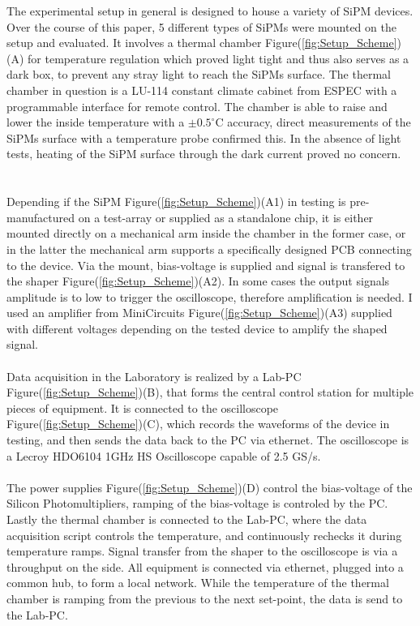 \documentclass[12pt,article,type=msc,colorback,accentcolor=tud9c]{tudthesis}
\begin{document}
The experimental setup in general is designed to house a variety of SiPM devices. Over the course of this paper, 5 different types of SiPMs were mounted on the setup and evaluated. It involves a thermal chamber Figure(\ref{fig:Setup_Scheme})(A) for temperature regulation which proved light tight and thus also serves as a dark box, to prevent any stray light to reach the SiPMs surface. The thermal chamber in question is a LU-114 constant climate cabinet from ESPEC with a programmable interface for remote control. The chamber is able to raise and lower the inside temperature with a $\pm0.5^\circ$C accuracy, direct measurements of the SiPMs surface with a temperature probe confirmed this. In the absence of light tests, heating of the SiPM surface through the dark current proved no concern.\\\\\\ Depending if the SiPM Figure(\ref{fig:Setup_Scheme})(A1) in testing is pre-manufactured on a test-array or supplied as a standalone chip, it is either mounted directly on a mechanical arm inside the chamber in the former case, or in the latter the mechanical arm supports a specifically designed PCB connecting to the device. Via the mount, bias-voltage is supplied and signal is transfered to the shaper Figure(\ref{fig:Setup_Scheme})(A2). In some cases the output signals amplitude is to low to trigger the oscilloscope, therefore amplification is needed. I used an amplifier from MiniCircuits Figure(\ref{fig:Setup_Scheme})(A3) supplied with different voltages depending on the tested device to amplify the shaped signal.\\\\
Data acquisition in the Laboratory is realized by a Lab-PC Figure(\ref{fig:Setup_Scheme})(B), that forms the central control station for multiple pieces of equipment. It is connected to the oscilloscope Figure(\ref{fig:Setup_Scheme})(C), which records the waveforms of the device in testing, and then sends the data back to the PC via ethernet. The oscilloscope is a Lecroy HDO6104 1GHz HS Oscilloscope capable of 2.5 GS/s.\\\\ The power supplies Figure(\ref{fig:Setup_Scheme})(D) control the bias-voltage of the Silicon Photomultipliers, ramping of the bias-voltage is controled by the PC. Lastly the thermal chamber is connected to the Lab-PC, where the data acquisition script controls the temperature, and continuously rechecks it during temperature ramps. Signal transfer from the shaper to the oscilloscope is via a throughput on the side. All equipment is connected via ethernet, plugged into a common hub, to form a local network. While the temperature of the thermal chamber is ramping from the previous to the next set-point, the data is send to the Lab-PC.\\\\
\end{document}

